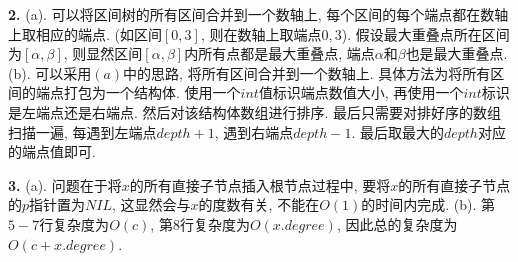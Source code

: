 \documentclass{article}
\begin{document}
	\begin{solution}\textnormal{\textbf{2.}}
		(a). 可以将区间树的所有区间合并到一个数轴上, 每个区间的每个端点都在数轴上取相应的端点.
		(如区间$[0, 3]$, 则在数轴上取端点$0, 3$).\newline
		假设最大重叠点所在区间为$[\alpha, \beta]$, 则显然区间$[\alpha, \beta]$内所有点都是最大重叠点, 端点$\alpha$和$\beta$也是最大重叠点.\newline
		(b). 可以采用$(a)$中的思路, 将所有区间合并到一个数轴上. 具体方法为将所有区间的端点打包为一个结构体.
		使用一个$int$值标识端点数值大小, 再使用一个$int$标识是左端点还是右端点. 然后对该结构体数组进行排序.\newline
		最后只需要对排好序的数组扫描一遍, 每遇到左端点$depth + 1$, 遇到右端点$depth - 1$. 最后取最大的$depth$对应的端点值即可.
	\end{solution}
	\begin{solution}\textnormal{\textbf{3.}}
		(a). 问题在于将$x$的所有直接子节点插入根节点过程中, 要将$x$的所有直接子节点的$p$指针置为$NIL$,
		这显然会与$x$的度数有关, 不能在$O(1)$的时间内完成.\newline
		(b). 第$5-7$行复杂度为$O(c)$, 第$8$行复杂度为$O(x.degree)$, 因此总的复杂度为$O(c + x.degree)$.
	\end{solution}
\end{document}
